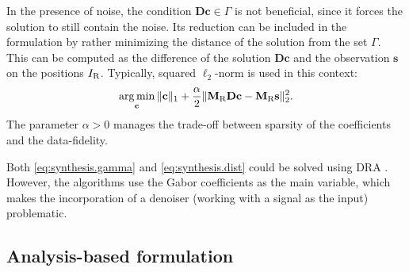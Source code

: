 \documentclass[conference]{IEEEtran}
\begin{document}
%
%		

In the presence of noise, the condition $\mathbf{D}\mathbf {c}\in \Gamma$ is not beneficial, since it forces the solution to still contain the noise.
Its reduction can be included in the formulation by rather minimizing the distance of the solution from the set $\Gamma$.
This can be computed as the difference of the solution $\mathbf{D}\mathbf{c}$ and the observation $\mathbf{s}$  on the positions $I_\textup{R}$.
Typically, squared $\ell_2$-norm is used in this context:
\begin{equation}
	\label{eq:synthesis.dist}
	\mathop {\operatorname{arg \, min}}_\mathbf {c}\Vert \mathbf {c}\Vert _1 + \frac{\alpha}{2} \Vert \mathbf{M}_{\textup{R}} \mathbf{D}\mathbf {c} - \mathbf{M}_{\textup{R}} \mathbf{s} \Vert^2_2.
\end{equation} 
The parameter $\alpha > 0$ manages the trade-off between sparsity of the coefficients and the data-fidelity.

%
Both \eqref{eq:synthesis.gamma} and \eqref{eq:synthesis.dist} could be solved using DRA \cite{Mokry2020, Zaviska2021}.
However, the algorithms use the Gabor coefficients as the main variable, which makes the incorporation of a denoiser (working with a signal as the input) problematic.


\subsection{Analysis-based formulation}\label{subsec:timecoef}
\end{document}

